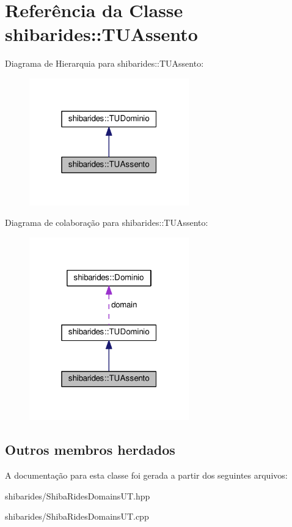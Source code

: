 \hypertarget{classshibarides_1_1TUAssento}{}\section{Referência da Classe shibarides\+:\+:T\+U\+Assento}
\label{classshibarides_1_1TUAssento}


Diagrama de Hierarquia para shibarides\+:\+:T\+U\+Assento\+:\nopagebreak
\begin{figure}[H]
\begin{center}
\leavevmode
\includegraphics[width=196pt]{classshibarides_1_1TUAssento__inherit__graph}
\end{center}
\end{figure}


Diagrama de colaboração para shibarides\+:\+:T\+U\+Assento\+:\nopagebreak
\begin{figure}[H]
\begin{center}
\leavevmode
\includegraphics[width=196pt]{classshibarides_1_1TUAssento__coll__graph}
\end{center}
\end{figure}
\subsection*{Outros membros herdados}


A documentação para esta classe foi gerada a partir dos seguintes arquivos\+:\begin{DoxyCompactItemize}
\item 
shibarides/Shiba\+Rides\+Domains\+U\+T.\+hpp\item 
shibarides/Shiba\+Rides\+Domains\+U\+T.\+cpp\end{DoxyCompactItemize}
